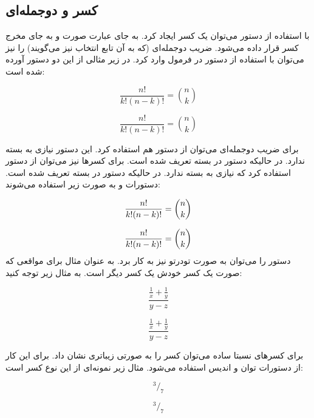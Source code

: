 \subsection{کسر و دوجمله‌ای}
با استفاده از دستور 
می‌توان یک کسر ایجاد کرد. به جای  عبارت صورت و به جای
 مخرج کسر قرار داده می‌شود. ضریب دوجمله‌ای (که به آن تابع
انتخاب نیز می‌گویند) را نیز می‌توان با استفاده از دستور  در فرمول وارد کرد. در زیر مثالی از این دو
دستور آورده شده است:
\begin{latex}
\[
 \frac{n!}{k!(n-k)!} = \binom{n}{k}
\]
\end{latex}
\[
 \frac{n!}{k!(n-k)!} = \binom{n}{k}
\]
	
\begin{note}
برای ضریب دوجمله‌ای می‌توان از دستور  هم استفاده کرد.
این دستور نیازی به بسته  ندارد. در حالیکه دستور \lr{\\binom} در بسته
\lr{\\amsmath} تعریف شده است. برای کسرها نیز می‌توان از دستور \lr{\\over}
استفاده کرد که نیازی به بسته  ندارد. در حالیکه دستور \lr{\\frac} در
بسته  تعریف شده است.
دستورات \lr{\\choose} و \lr{\\over} به صورت زیر
استفاده می‌شوند:
\end{note}
\begin{latex}
\[
  {n! \over k!(n-k)!} = {n \choose k}
\]
\end{latex}
\[
  {n! \over k!(n-k)!} = {n \choose k}
\]
دستور  را می‌توان به صورت تودرتو نیز به کار برد. به
عنوان مثال برای مواقعی که صورت یک کسر خودش یک کسر دیگر است. به مثال زیر توجه
کنید:
\begin{latex}
\[
 \frac{\frac{1}{x}+\frac{1}{y}}{y-z}
\]
\end{latex}
\[
 \frac{\frac{1}{x}+\frac{1}{y}}{y-z}
\]

\begin{note}
برای کسرهای نسبتا ساده می‌توان کسر را به صورتی زیباتری نشان داد. برای این کار از
دستورات توان و اندیس استفاده می‌شود. مثال زیر نمونه‌ای از این نوع کسر است:
\end{note}
\begin{latex}
\[
 ^3/_7
\]
\end{latex}
\[
 ^3/_7
\]

